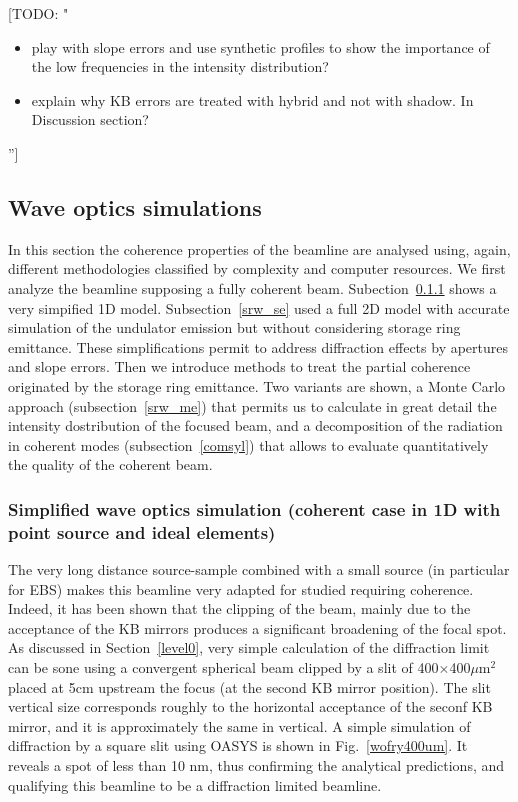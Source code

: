 \documentclass{iucr}              %
\newcommand{\todo}[1]{{\color{red}[TODO: "#1'']}}
\begin{document}
\todo{
\begin{itemize}
 \item play with slope errors and use synthetic profiles to show the importance of the low frequencies in the intensity distribution?
 \item explain why KB errors are treated with hybrid and not with shadow. In Discussion section? 
\end{itemize}
}



\subsection{Wave optics simulations}
\label{level2}

In this section the coherence properties of the beamline are analysed using, again, different methodologies classified by complexity and computer resources. We first analyze the beamline supposing a fully coherent beam. Subection~\ref{wofry} shows a very simpified 1D model. Subsection~\ref{srw_se} used a full 2D model with accurate simulation of the undulator emission but without considering storage ring emittance. These simplifications permit to address diffraction effects by apertures and slope errors. Then we introduce methods to treat the partial coherence originated by the storage ring emittance. Two variants are shown, a Monte Carlo approach (subsection~\ref{srw_me}) that permits us to calculate in great detail the intensity dostribution of the focused beam, and a decomposition of the radiation in coherent modes (subsection~\ref{comsyl}) that allows to evaluate quantitatively the quality of the coherent beam.  


\subsubsection{Simplified wave optics simulation (coherent case in 1D with point source and ideal elements)}
\label{wofry}

The very long distance source-sample combined with a small source (in particular for EBS) makes this beamline very adapted for studied requiring coherence. Indeed, it has been shown that the clipping of the beam, mainly due to the acceptance of the KB mirrors produces a significant broadening of the focal spot.  As discussed in Section~\ref{level0}, very simple calculation of the diffraction limit can be sone using a convergent spherical beam clipped by a slit of 400$\times$400$ \mu$m$^2$ placed at 5cm upstream the focus (at the second KB mirror position). The slit vertical size corresponds roughly to the horizontal acceptance of the seconf KB mirror, and it is approximately the same in vertical. A simple simulation of diffraction by a square slit using OASYS is shown in Fig.~\ref{wofry400um}. It reveals a spot of less than 10 nm, thus confirming the analytical predictions, and qualifying this beamline to be a diffraction limited beamline.  
\end{document}
